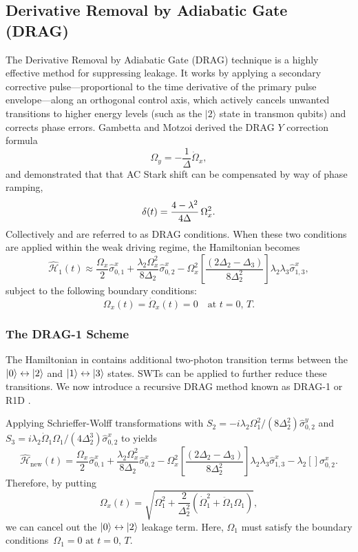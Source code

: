 \subsection{Derivative Removal by Adiabatic Gate (DRAG)}
\label{subsec:drag}
The Derivative Removal by Adiabatic Gate (DRAG) technique is a highly effective method for suppressing leakage.
It works by applying a secondary corrective pulse---proportional to the time derivative of the primary pulse
envelope---along an orthogonal control axis, which actively cancels unwanted transitions to higher energy levels (such as
the $\vert{}2\rangle$ state in transmon qubits) and corrects phase errors.
Gambetta and Motzoi \cite{Gambetta2011} derived the DRAG $Y$ correction formula
\begin{equation}
  \Omega_y = -\frac{1}{\Delta}\dot{\Omega}_x,
  \label{eq:ydrag}
\end{equation}
and demonstrated that that AC Stark shift can be compensated by way of phase ramping,
\begin{equation}
  \delta(t) = \dfrac{4-\lambda^2}{4\Delta}\,\Omega_{x}^2.
  \label{eq:zdrag}
\end{equation}
Collectively  and  are referred to as DRAG conditions.
When these two conditions are applied within the weak driving regime, the Hamiltonian becomes
\begin{equation}
  \hat{\mathcal{H}}_1(t) \approx \frac{\Omega_x}{2}\hat{\sigma}_{0,1}^x + \frac{\lambda_2 \Omega_x^2}{8\Delta_2}\hat{\sigma}_{0,2}^x - \Omega_x^2 \left[ \frac{(2\Delta_2 - \Delta_3)}{8\Delta_2^2} \right] \lambda_2 \lambda_3 \hat{\sigma}_{1,3}^x,
  \label{eq:Hdrag}
\end{equation}
subject to the following boundary conditions:
$$
  \Omega_x(t) = \dot{\Omega}_x(t)=0 \quad \text{at }t=0,\,T.
$$
\subsubsection{The DRAG-1 Scheme}
The Hamiltonian in  contains additional two-photon transition terms between the $\ket{0}\leftrightarrow\ket{2}$ and
$\ket{1}\leftrightarrow\ket{3}$ states.
SWTs can be applied to further reduce these transitions.
We now introduce a recursive DRAG method known as DRAG-1 \cite{Li2025} or R1D \cite{99999}.

Applying Schrieffer-Wolff transformations with $S_2 = -i\lambda_2\Omega_1^2/(8\Delta_2^2)\hat{\sigma}^y_{0,2}$ and
$S_3 = i\lambda_2\dot{\Omega}_1\Omega_1/(4\Delta_2^3)\hat{\sigma}^x_{0,2}$
to
 yields
$$
  \hat{\mathcal{H}}_\text{new}(t) = \frac{\Omega_x}{2}\hat{\sigma}_{0,1}^x + \frac{\lambda_2 \Omega_x^2}{8\Delta_2}\hat{\sigma}_{0,2}^x - \Omega_x^2 \left[ \frac{(2\Delta_2 - \Delta_3)}{8\Delta_2^2} \right] \lambda_2 \lambda_3 \hat{\sigma}_{1,3}^x
  - \lambda_2\left[\right]\sigma^x_{0,2}.
$$
Therefore, by putting
\begin{equation}
  \Omega_x(t) = \sqrt{\Omega_1^2 + \frac{2}{\Delta_2^2} (\dot{\Omega}_1^2 + \ddot{\Omega}_1 \Omega_1)},
  \label{eq:drag1}
\end{equation}
we can cancel out the $\ket{0}\leftrightarrow\ket{2}$ leakage term.
Here, $\Omega_1$ must satisfy the boundary conditions $\, \Omega_1 = 0 \text{ at }t=0,\,T. $

